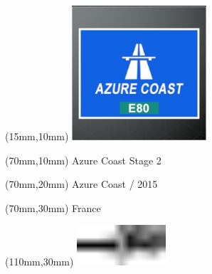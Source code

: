 \null\newpage
\begin{textblock*}{50mm}(15mm,10mm)%
\includegraphics[width=50mm]{LG/2015-05-20_00073.png}
\end{textblock*}
\begin{textblock*}{130mm}(70mm,10mm)%
{\fontsize{20}{20}\selectfont Azure Coast Stage 2}\\
\end{textblock*}
\begin{textblock*}{120mm}(70mm,20mm)%
{\fontsize{16}{16}\selectfont Azure Coast / 2015}\\
\end{textblock*}
\begin{textblock*}{120mm}(70mm,30mm)%
{\fontsize{12}{12}\selectfont France}
\end{textblock*}
\begin{textblock*}{30mm}(110mm,30mm)%
\centering
\includegraphics[height=15mm]{icons/tofinish.pdf}
\end{textblock*}
